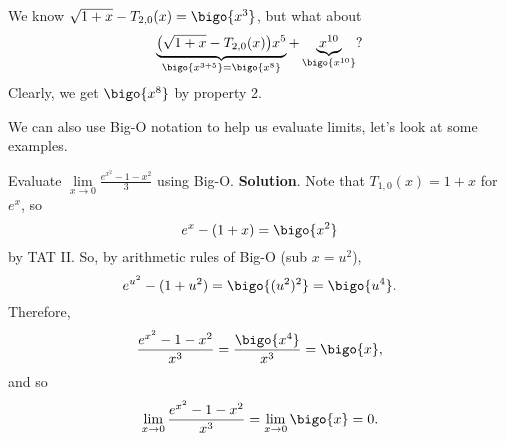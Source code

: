 \begin{Example}{}{}
    We know $ \sqrt{1+x}-T_{2,0}(x)=\bigo{x^3} $,
    but what about
    \[ \underbrace{\bigl(\sqrt{1+x}-T_{2,0}(x)\bigr)x^5}_{\bigo{x^{3+5}}=\bigo{x^{8}}}
        +\underbrace{x^{10}}_{\bigo{x^{10}}}? \]
    Clearly, we get $ \bigo{x^{8}} $ by property 2.
\end{Example}
We can also use Big-O notation to help us evaluate limits,
let's look at some examples.
\begin{Example}{}{}
    Evaluate $ \displaystyle \lim\limits_{{x} \to {0}}\frac{e^{x^2}-1-x^2}{3} $
    using Big-O\@.
    \tcblower{}
    \textbf{Solution}. Note that
    $ T_{1,0}(x)=1+x $ for $ e^x $, so
    \[ e^x-(1+x)=\bigo{x^2} \]
    by TAT II\@. So, by arithmetic rules of Big-O (sub $ x=u^2 $),
    \[ e^{u^2}-(1+u^2)=\bigo{(u^2)^2}=\bigo{u^4}. \]
    Therefore,
    \[ \frac{e^{x^2}-1-x^2}{x^3}=\frac{\bigo{x^4}}{x^3}=\bigo{x}, \]
    and so
    \[ \lim\limits_{{x} \to {0}}\frac{e^{x^2}-1-x^2}{x^3}=
        \lim\limits_{{x} \to {0}}\bigo{x}=0. \]
\end{Example}
